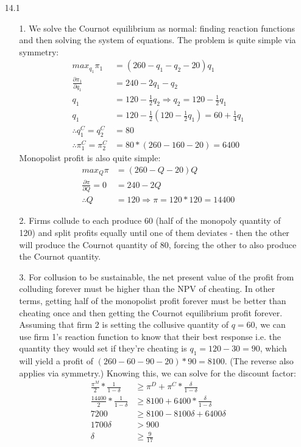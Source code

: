 \documentclass[12pt,letterpaper]{article}
\begin{document}
\begin{enumerate}
\item[14.1]
\begin{enumerate}
	\item[1.] We solve the Cournot equilibrium as normal: finding reaction functions and then solving the system of equations. The problem is quite simple via symmetry:
	\begin{align*}
		max_{q_1} \pi_1 &= (260 - q_1 - q_2 - 20) q_1 \\
		\frac{\partial\pi_1}{\partial q_1} &= 240 - 2q_1 - q_2 \\
		q_1 &= 120 - \frac{1}{2}q_2 \Rightarrow q_2 = 120 - \frac{1}{2}q_1 \\
		q_1 &= 120 - \frac{1}{2}(120 - \frac{1}{2}q_1) = 60 + \frac{1}{4}q_1 \\
		\therefore q_1^C = q_2^C &= 80 \\
		\therefore \pi_1^C = \pi_2^C &= 80 * (260 - 160 - 20) = 6400
	\end{align*}
	Monopolist profit is also quite simple:
	\begin{align*}
		max_Q \pi &= (260 - Q - 20) Q \\
		\frac{\partial\pi}{\partial Q}= 0 &= 240 - 2Q \\
		\therefore Q &= 120 \Rightarrow \pi = 120 * 120 = 14400
	\end{align*}
	\item[2.] Firms collude to each produce 60 (half of the monopoly quantity of 120) and split profits equally until one of them deviates - then the other will produce the Cournot quantity of 80, forcing the other to also produce the Cournot quantity.
	\item[3.] For collusion to be sustainable, the net present value of the profit from colluding forever must be higher than the NPV of cheating. In other terms, getting half of the monopolist profit forever must be better than cheating once and then getting the Cournot equilibrium profit forever. Assuming that firm 2 is setting the collusive quantity of $q=60$, we can use firm 1's reaction function to know that their best response i.e. the quantity they would set if they're cheating is $q_1 = 120-30 = 90$, which will yield a profit of $(260 - 60 - 90 - 20)*90 = 8100$. (The reverse also applies via symmetry.) Knowing this, we can solve for the discount factor: 
	\begin{align*}
		\frac{\pi^M}{2} * \frac{1}{1-\delta} &\geq \pi^D + \pi^C * \frac{\delta}{1 - \delta}\\
		\frac{14400}{2} * \frac{1}{1-\delta} &\geq 8100 + 6400 * \frac{\delta}{1 - \delta}\\
		7200 &\geq 8100 - 8100\delta + 6400\delta \\
		1700\delta &> 900 \\
		\delta &\geq \frac{9}{17} 
	\end{align*} 
\end{enumerate}



\end{enumerate}
\end{document}
